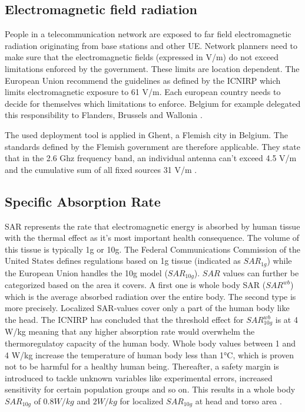 \subsection{Electromagnetic field radiation} %
\label{sub:emf}
People in a telecommunication network are exposed to far field electromagnetic radiation originating from base stations and other \gls{UE}. 
Network planners need to make sure that the electromagnetic fields (expressed in V/m) do not exceed limitations enforced 
by the government. These limits are location dependent. The European Union recommend the guidelines as defined by the \gls{ICNIRP} which limits electromagnetic exposure to 61 V/m.
Each european country needs to decide for themselves which limitations to enforce. Belgium for example delegated this responsibility to Flanders, Brussels and Wallonia \cite{J23}.

The used deployment tool is applied in Ghent, a Flemish city in Belgium. The standards defined by the Flemish government are therefore applicable.
They state that in the 2.6 Ghz frequency band, an individual antenna can't exceed 4.5 V/m and the cumulative sum of all fixed sources 31 V/m \cite{S13_normenBelgie}.

\subsection{Specific Absorption Rate}

\gls{SAR} represents the rate that electromagnetic energy is absorbed by human tissue with the thermal effect as it's most important health consequence.
The volume of this tissue is typically 1g or 10g. The Federal Communications Commission of the United States defines regulations based on 1g tissue (indicated as $SAR_{1g}$) 
while the European Union handles the 
10g model ($SAR_{10g}$). $SAR$ values can further be categorized based on the area it covers. 
A first one is whole body \gls{SAR} ($SAR^{wb}$) which is the average absorbed radiation over the entire 
body. The second type is more precisely. Localized \gls{SAR}-values cover only  a part of the human body like the head.
The \gls{ICNIRP} has concluded that the threshold effect for $SAR^{wb}_{10g}$ is at 4 W/kg meaning that any higher absorption rate would overwhelm the thermoregulatoy capacity of the human body.
Whole body values between 1 and 4 W/kg increase the temperature of human body less than 1°C, which is proven not to be harmful for a healthy human being\cite{J24}.
Thereafter, a safety margin is introduced to tackle unknown variables like experimental errors, increased sensitivity for certain population groups and so on. 
This results in a whole body $SAR_{10g}$ of $0.8 W/kg$ and $2 W/kg$ for localized $SAR_{10g}$ at head and torso area \cite{J23}.

